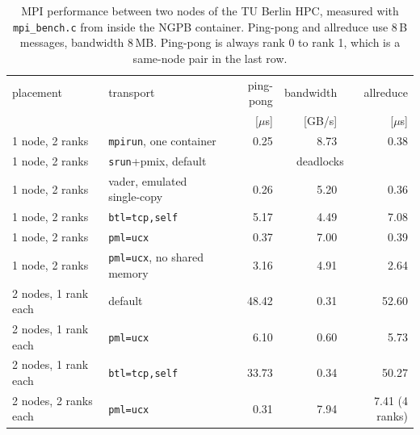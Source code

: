 \begin{table}[htbp]
    \centering
    \footnotesize
    \begin{tabular}{llrrr}
        \toprule
        placement & transport & ping-pong & bandwidth & allreduce \\
                  &           & [$\mu$s]  & [GB/s]    & [$\mu$s]  \\
        \midrule
        1 node, 2 ranks & \texttt{mpirun}, one container & 0.25 & 8.73 & 0.38 \\
        1 node, 2 ranks & \texttt{srun}+pmix, default & \multicolumn{3}{c}{deadlocks} \\
        1 node, 2 ranks & vader, emulated single-copy & 0.26 & 5.20 & 0.36 \\
        1 node, 2 ranks & \texttt{btl=tcp,self} & 5.17 & 4.49 & 7.08 \\
        1 node, 2 ranks & \texttt{pml=ucx} & 0.37 & 7.00 & 0.39 \\
        1 node, 2 ranks & \texttt{pml=ucx}, no shared memory & 3.16 & 4.91 & 2.64 \\
        \midrule
        2 nodes, 1 rank each & default & 48.42 & 0.31 & 52.60 \\
        2 nodes, 1 rank each & \texttt{pml=ucx} & 6.10 & 0.60 & 5.73 \\
        2 nodes, 1 rank each & \texttt{btl=tcp,self} & 33.73 & 0.34 & 50.27 \\
        \midrule
        2 nodes, 2 ranks each & \texttt{pml=ucx} & 0.31 & 7.94 & 7.41 (4 ranks) \\
        \bottomrule
    \end{tabular}
    \caption{MPI performance between two nodes of the TU Berlin HPC, measured
        with \texttt{mpi\_bench.c} from inside the NGPB container. Ping-pong and
        allreduce use 8\,B messages, bandwidth 8\,MB. Ping-pong is always rank 0
        to rank 1, which is a same-node pair in the last row.}
    \label{tab:mpi-latency-table}
\end{table}
